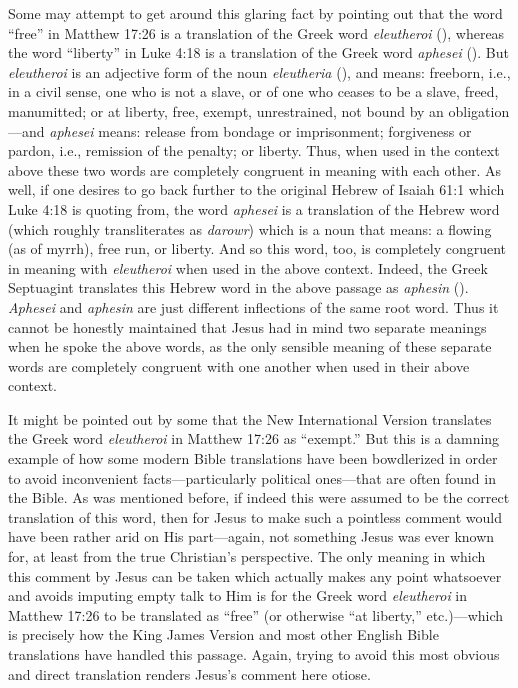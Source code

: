 \documentclass[letterpaper,12pt]{article}
\begin{document}
Some may attempt to get around this glaring fact by pointing out that the word ``free'' in Matthew 17:26 is a translation of the Greek word \emph{eleutheroi} (), whereas the word ``liberty'' in Luke 4:18 is a translation of the Greek word \emph{aphesei} (). But \emph{eleutheroi} is an adjective form of the noun \emph{eleutheria} (), and means: freeborn, i.e., in a civil sense, one who is not a slave, or of one who ceases to be a slave, freed, manumitted; or at liberty, free, exempt, unrestrained, not bound by an obligation---and \emph{aphesei} means: release from bondage or imprisonment; forgiveness or pardon, i.e., remission of the penalty; or liberty. Thus, when used in the context above these two words are completely congruent in meaning with each other. As well, if one desires to go back further to the original Hebrew of Isaiah 61:1 which Luke 4:18 is quoting from, the word \emph{aphesei} is a translation of the Hebrew word  (which roughly transliterates as \emph{darowr}) which is a noun that means: a flowing (as of myrrh), free run, or liberty. And so this word, too, is completely congruent in meaning with \emph{eleutheroi} when used in the above context. Indeed, the Greek Septuagint translates this Hebrew word in the above passage as \emph{aphesin} (). \emph{Aphesei} and \emph{aphesin} are just different inflections of the same root word. Thus it cannot be honestly maintained that Jesus had in mind two separate meanings when he spoke the above words, as the only sensible meaning of these separate words are completely congruent with one another when used in their above context.

It might be pointed out by some that the New International Version translates the Greek word \emph{eleutheroi} in Matthew 17:26 as ``exempt.'' But this is a damning example of how some modern Bible translations have been bowdlerized in order to avoid inconvenient facts---particularly political ones---that are often found in the Bible. As was mentioned before, if indeed this were assumed to be the correct translation of this word, then for Jesus to make such a pointless comment would have been rather arid on His part---again, not something Jesus was ever known for, at least from the true Christian's perspective. The only meaning in which this comment by Jesus can be taken which actually makes any point whatsoever and avoids imputing empty talk to Him is for the Greek word \emph{eleutheroi} in Matthew 17:26 to be translated as ``free'' (or otherwise ``at liberty,'' etc.)---which is precisely how the King James Version and most other English Bible translations have handled this passage. Again, trying to avoid this most obvious and direct translation renders Jesus's comment here otiose.
\end{document}
